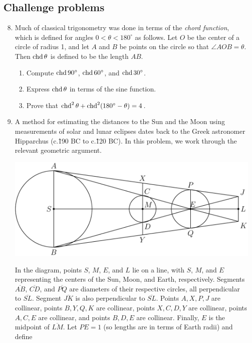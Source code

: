 \subsection{Challenge problems}

\begin{enumerate}\setcounter{enumi}{7}
\item Much of classical trigonometry was done in terms of the \emph{chord function}, which is defined for angles $0 < \theta < 180^{\circ}$ as follows. Let $O$ be the center of a circle of radius 1, and let $A$ and $B$ be points on the circle so that $\angle AOB = \theta$. Then $\operatorname{chd}\theta$ is defined to be the length $AB$.
\begin{enumerate}
\item Compute $\operatorname{chd} 90^{\circ}$, $\operatorname{chd} 60^{\circ}$, and $\operatorname{chd} 30^{\circ}$.
\item Express $\operatorname{chd}\theta$ in terms of the sine function.
\item Prove that $\operatorname{chd}^2\theta + \operatorname{chd}^2(180^{\circ} - \theta) = 4$.
\end{enumerate}\newpage
\item A method for estimating the distances to the Sun and the Moon using measurements of solar and lunar eclipses dates back to the Greek astronomer Hipparchus (c.\~190 BC to c.\~120 BC). In this problem, we work through the relevant geometric argument.
\begin{center}
\includegraphics[scale=0.4]{hipparchus-2.png}
\end{center}
In the diagram, points $S$, $M$, $E$, and $L$ lie on a line, with $S$, $M$, and $E$ representing the centers of the Sun, Moon, and Earth, respectively. Segments $\overline{AB}$, $\overline{CD}$, and $\overline{PQ}$ are diameters of their respective circles, all perpendicular to $\overline{SL}$. Segment $\overline{JK}$ is also perpendicular to $\overline{SL}$. Points $A, X, P, J$ are collinear, points $B, Y, Q, K$ are collinear, points $X, C, D, Y$ are collinear, points $A, C, E$ are collinear, and points $B, D, E$ are collinear. Finally, $E$ is the midpoint of $\overline{LM}$. Let $PE = 1$ (so lengths are in terms of Earth radii) and define

\end{enumerate}
